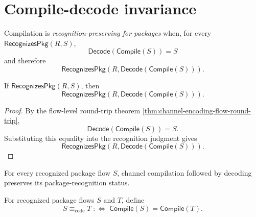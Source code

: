 \section{Compile-decode invariance}
\label{sec:package-generated-compile-decode}

\begin{definition}
\label{def:package-generated-recognition-preserving-compilation}
Compilation is \emph{recognition-preserving for packages} when, for every $\mathsf{RecognizesPkg}(R,S)$,
$$
  \mathsf{Decode}(\mathsf{Compile}(S)) = S
$$
and therefore
$$
  \mathsf{RecognizesPkg}(R,\mathsf{Decode}(\mathsf{Compile}(S))).
$$
\end{definition}

\begin{theorem}
\label{thm:package-generated-compilation-preserves-recognition}
If $\mathsf{RecognizesPkg}(R,S)$, then
$$
  \mathsf{RecognizesPkg}(R,\mathsf{Decode}(\mathsf{Compile}(S))).
$$
\end{theorem}

\begin{proof}
By the flow-level round-trip theorem \autoref{thm:channel-encoding-flow-round-trip},
$$
  \mathsf{Decode}(\mathsf{Compile}(S)) = S.
$$
Substituting this equality into the recognition judgment gives
$$
  \mathsf{RecognizesPkg}(R,\mathsf{Decode}(\mathsf{Compile}(S))).
$$
\end{proof}

\begin{corollary}
\label{cor:package-generated-recognition-invariant}
For every recognized package flow $S$, channel compilation followed by decoding preserves its package-recognition status.
\end{corollary}

\begin{definition}
\label{def:package-generated-code-equivalence}
For recognized package flows $S$ and $T$, define
$$
  S \equiv_{\mathrm{code}} T
  \;:\Longleftrightarrow\;
  \mathsf{Compile}(S)=\mathsf{Compile}(T).
$$
\end{definition}

